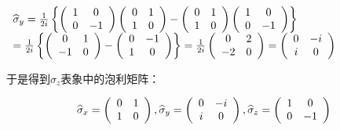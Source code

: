 $\begin{array}{l}
 \widehat\sigma _y   = \frac{1}{{2i}}\left\{ {\left( {\begin{array}{*{20}c}
   1 & 0  \\
   0 & { - 1}  \\
\end{array}} \right)\left( {\begin{array}{*{20}c}
   0 & 1  \\
   1 & 0  \\
\end{array}} \right) - \left( {\begin{array}{*{20}c}
   0 & 1  \\
   1 & 0  \\
\end{array}} \right)\left( {\begin{array}{*{20}c}
   1 & 0  \\
   0 & { - 1}  \\
\end{array}} \right)} \right\} \\
  = \frac{1}{{2i}}\left\{ {\left( {\begin{array}{*{20}c}
   0 & 1  \\
   { - 1} & 0  \\
\end{array}} \right) - \left( {\begin{array}{*{20}c}
   0 & { - 1}  \\
   1 & 0  \\
\end{array}} \right)} \right\} = \frac{1}{{2i}}\left( {\begin{array}{*{20}c}
   0 & 2  \\
   { - 2} & 0  \\
\end{array}} \right) = \left( {\begin{array}{*{20}c}
   0 & { - i}  \\
   i & 0  \\
\end{array}} \right) \\
 \end{array}$


于是得到$\hat \sigma_z$表象中的泡利矩阵：

\begin{equation}\label{pauli matrix}
\widehat\sigma _x  = \left( {\begin{array}{*{20}c}
   0 & 1  \\
   1 & 0  \\
\end{array}} \right)
,
\widehat\sigma _y  = \left( {\begin{array}{*{20}c}
   0 & { - i}  \\
   i & 0  \\
\end{array}} \right),
\widehat\sigma _z  = \left( {\begin{array}{*{20}c}
   1 & 0  \\
   0 & { - 1}  \\
\end{array}} \right)
\end{equation}


